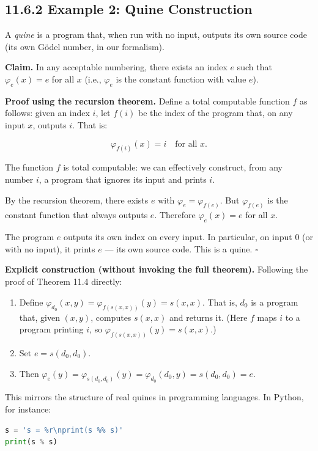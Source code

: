 \subsection{11.6.2 Example 2: Quine Construction}

A \textit{quine} is a program that, when run with no input, outputs its own source code (its own Gödel number, in our formalism).

\textbf{Claim.} In any acceptable numbering, there exists an index $e$ such that $\varphi_e(x) = e$ for all $x$ (i.e., $\varphi_e$ is the constant function with value $e$).

\textbf{Proof using the recursion theorem.} Define a total computable function $f$ as follows: given an index $i$, let $f(i)$ be the index of the program that, on any input $x$, outputs $i$. That is:

\[
\varphi_{f(i)}(x) = i \quad \text{for all } x.
\]

The function $f$ is total computable: we can effectively construct, from any number $i$, a program that ignores its input and prints $i$.

By the recursion theorem, there exists $e$ with $\varphi_e = \varphi_{f(e)}$. But $\varphi_{f(e)}$ is the constant function that always outputs $e$. Therefore $\varphi_e(x) = e$ for all $x$.

The program $e$ outputs its own index on every input. In particular, on input 0 (or with no input), it prints $e$ --- its own source code. This is a quine. $\square$

\textbf{Explicit construction (without invoking the full theorem).} Following the proof of Theorem 11.4 directly:

\begin{enumerate}
  \item Define $\varphi_{d_0}(x, y) = \varphi_{f(s(x,x))}(y) = s(x, x)$. That is, $d_0$ is a program that, given $(x, y)$, computes $s(x, x)$ and returns it. (Here $f$ maps $i$ to a program printing $i$, so $\varphi_{f(s(x,x))}(y) = s(x,x)$.)
  \item Set $e = s(d_0, d_0)$.
  \item Then $\varphi_e(y) = \varphi_{s(d_0, d_0)}(y) = \varphi_{d_0}(d_0, y) = s(d_0, d_0) = e$.
\end{enumerate}

This mirrors the structure of real quines in programming languages. In Python, for instance:

\begin{lstlisting}[language=Python]
s = 's = %r\nprint(s %% s)'
print(s % s)
\end{lstlisting}

